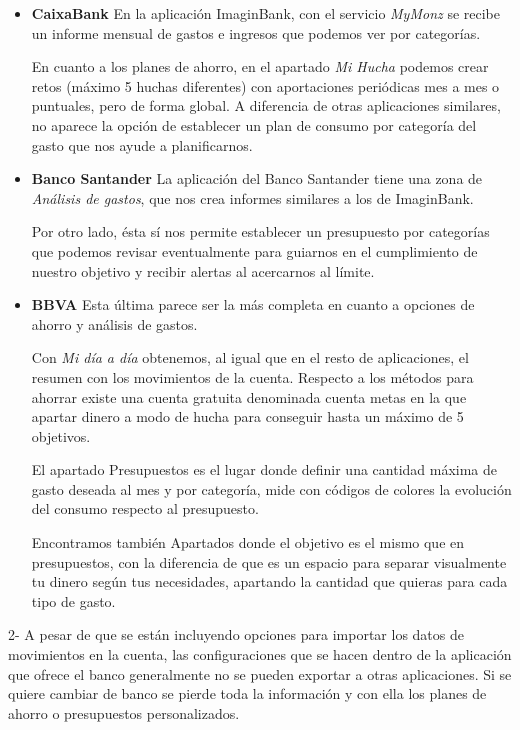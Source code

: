 \begin{itemize}

    \item \textbf{CaixaBank} 
    En la aplicación ImaginBank, con el servicio \textit{MyMonz\cite{MyMonz}}
    se recibe un informe mensual de gastos e ingresos que podemos ver por categorías. 

    En cuanto a los planes de ahorro, en el apartado \textit{Mi Hucha} podemos crear retos\cite{retos} (máximo 5 huchas diferentes)
    con aportaciones periódicas mes a mes o puntuales, pero de forma global.
    A diferencia de otras aplicaciones similares, no aparece la opción de establecer un plan de 
    consumo por categoría del gasto que nos ayude a planificarnos.

    \item \textbf{Banco Santander}
    La aplicación del Banco Santander\cite{Santander} tiene una zona de \textit{Análisis de gastos}, que nos crea 
    informes similares a los de ImaginBank. 

    Por otro lado, ésta sí nos permite establecer un 
    presupuesto por categorías que podemos revisar eventualmente para guiarnos en el 
    cumplimiento de nuestro objetivo y recibir alertas al acercarnos al límite.

    \item \textbf{BBVA}
    Esta última parece ser la más completa en cuanto a opciones de ahorro y análisis de gastos.

    Con \textit{Mi día\cite{día} a día}  
    obtenemos, al igual que en el resto de aplicaciones, el resumen con los movimientos de la cuenta.
    Respecto a los métodos para ahorrar existe una cuenta gratuita denominada 
    cuenta metas\cite{metas} 
    en la que apartar dinero a modo de hucha para conseguir hasta un máximo de 5 objetivos. 

    El apartado Presupuestos\cite{Presupuestos} 
    es el lugar donde definir una cantidad máxima de gasto deseada 
    al mes y por categoría, mide con códigos de colores la evolución del consumo 
    respecto al presupuesto.

    Encontramos también Apartados\cite{Apartados} 
    donde el objetivo es el mismo que en presupuestos, con la diferencia de 
    que es un espacio para separar visualmente tu dinero según tus necesidades,
    apartando la cantidad que quieras para cada tipo de gasto.

\end{itemize}


2- A pesar de que se están incluyendo opciones para importar los 
datos de movimientos en la cuenta, las configuraciones que se hacen dentro de la aplicación 
que ofrece el banco generalmente no se pueden exportar a otras aplicaciones.
Si se quiere cambiar de banco se pierde toda la información 
y con ella los planes de ahorro o presupuestos personalizados.


